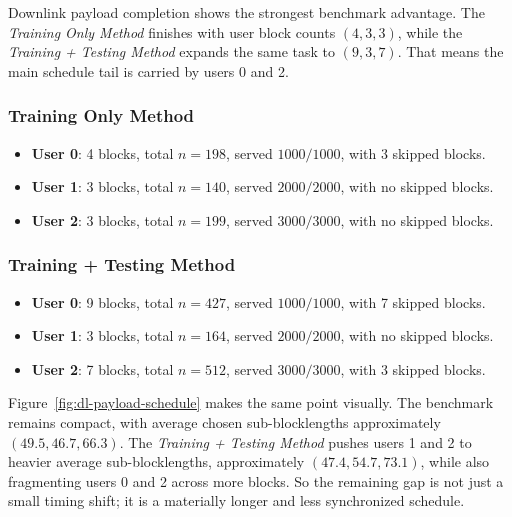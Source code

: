 \documentclass[11pt]{article}
\begin{document}
Downlink payload completion shows the strongest benchmark advantage. The
\emph{Training Only Method} finishes with user block counts \((4,3,3)\), while
the \emph{Training + Testing Method} expands the same task to \((9,3,7)\).
That means the main schedule tail is carried by users 0 and 2.

\subsubsection*{Training Only Method}

\begin{itemize}[leftmargin=1.5em,itemsep=0.2em,topsep=0.3em]
    \item \textbf{User 0}: 4 blocks, total \(n=198\), served \(1000/1000\), with 3 skipped blocks.
    \item \textbf{User 1}: 3 blocks, total \(n=140\), served \(2000/2000\), with no skipped blocks.
    \item \textbf{User 2}: 3 blocks, total \(n=199\), served \(3000/3000\), with no skipped blocks.
\end{itemize}

\subsubsection*{Training + Testing Method}

\begin{itemize}[leftmargin=1.5em,itemsep=0.2em,topsep=0.3em]
    \item \textbf{User 0}: 9 blocks, total \(n=427\), served \(1000/1000\), with 7 skipped blocks.
    \item \textbf{User 1}: 3 blocks, total \(n=164\), served \(2000/2000\), with no skipped blocks.
    \item \textbf{User 2}: 7 blocks, total \(n=512\), served \(3000/3000\), with 3 skipped blocks.
\end{itemize}

Figure~\ref{fig:dl-payload-schedule} makes the same point visually. The
benchmark remains compact, with average chosen sub-blocklengths approximately
\((49.5,46.7,66.3)\). The \emph{Training + Testing Method} pushes users 1 and 2
to heavier average sub-blocklengths, approximately \((47.4,54.7,73.1)\), while
also fragmenting users 0 and 2 across more blocks. So the remaining gap is not
just a small timing shift; it is a materially longer and less synchronized
schedule.
\end{document}
